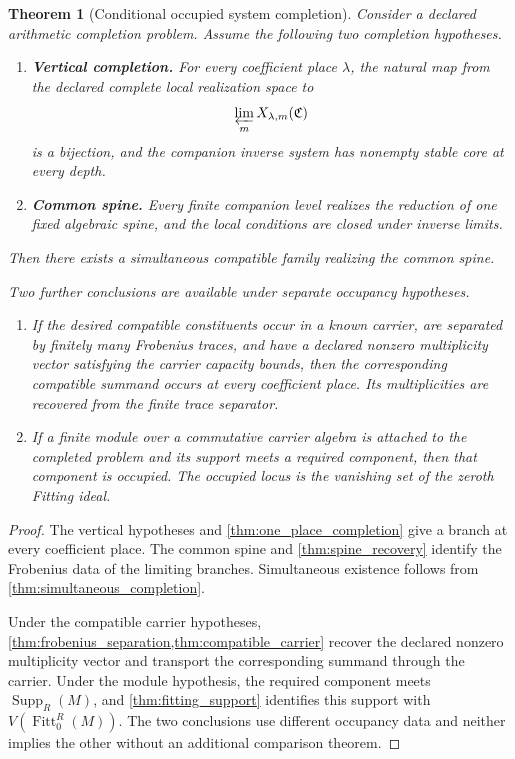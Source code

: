 \documentclass{aomart}
\newtheorem{theorem}{Theorem}[section]
\theoremstyle{definition}
\theoremstyle{remark}
\newcommand{\Supp}{\operatorname{Supp}}
\newcommand{\Fitt}{\operatorname{Fitt}}
\newcommand{\mathfrakC}{\mathfrak C}
\begin{document}
\begin{theorem}[Conditional occupied system completion]\label{thm:conditional_completion}
Consider a declared arithmetic completion problem. Assume the following two completion hypotheses.

\begin{enumerate}
\item \textbf{Vertical completion.} For every coefficient place \(\lambda\), the natural map from the declared complete local realization space to
\[
\varprojlim_mX_{\lambda,m}(\mathfrakC)
\]
is a bijection, and the companion inverse system has nonempty stable core at every depth.
\item \textbf{Common spine.} Every finite companion level realizes the reduction of one fixed algebraic spine, and the local conditions are closed under inverse limits.
\end{enumerate}

Then there exists a simultaneous compatible family realizing the common spine.

Two further conclusions are available under separate occupancy hypotheses.

\begin{enumerate}
\item If the desired compatible constituents occur in a known carrier, are separated by finitely many Frobenius traces, and have a declared nonzero multiplicity vector satisfying the carrier capacity bounds, then the corresponding compatible summand occurs at every coefficient place. Its multiplicities are recovered from the finite trace separator.
\item If a finite module over a commutative carrier algebra is attached to the completed problem and its support meets a required component, then that component is occupied. The occupied locus is the vanishing set of the zeroth Fitting ideal.
\end{enumerate}
\end{theorem}

\begin{proof}
The vertical hypotheses and \cref{thm:one_place_completion} give a branch at every coefficient place. The common spine and \cref{thm:spine_recovery} identify the Frobenius data of the limiting branches. Simultaneous existence follows from \cref{thm:simultaneous_completion}.

Under the compatible carrier hypotheses, \cref{thm:frobenius_separation,thm:compatible_carrier} recover the declared nonzero multiplicity vector and transport the corresponding summand through the carrier. Under the module hypothesis, the required component meets \(\Supp_R(M)\), and \cref{thm:fitting_support} identifies this support with \(V(\Fitt_0^R(M))\). The two conclusions use different occupancy data and neither implies the other without an additional comparison theorem.
\end{proof}
\end{document}

